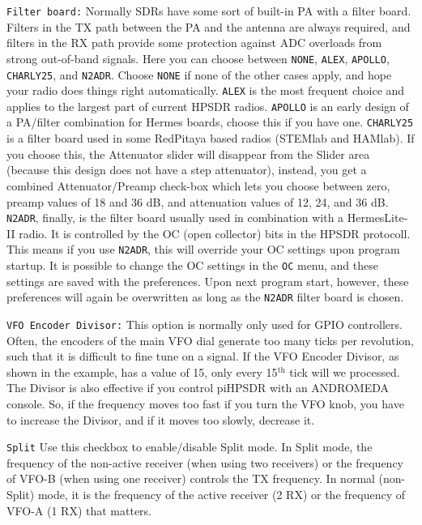\documentclass[12pt]{book}
\def\rett#1{\texttt{\color{red}#1}}
\def\bltt#1{\texttt{\color{blue}#1}}
\begin{document}
\rett{Filter board:} Normally SDRs have some sort of built-in PA with a filter board. Filters in the TX path
between the PA and the antenna are always required, and filters in the RX path provide some protection
against ADC overloads from strong out-of-band signals. Here you can choose between \texttt{NONE},
\texttt{ALEX},
\texttt{APOLLO}, \texttt{CHARLY25}, and \texttt{N2ADR}. Choose \texttt{NONE} if none of the other cases
apply, and hope your radio does things right automatically. \texttt{ALEX} is the most frequent choice
and applies to the largest part of current HPSDR radios. \texttt{APOLLO} is an early design of a
PA/filter combination for Hermes boards, choose this if you have one. \texttt{CHARLY25} is a filter board
used in some RedPitaya based radios (STEMlab and HAMlab). If you choose this, the Attenuator slider will
disappear from the Slider area (because this design does not have a step attenuator), instead, you get
a combined Attenuator/Preamp check-box which lets you choose between zero, preamp values of 18 and 36 dB,
and attenuation values of 12, 24, and 36 dB. \texttt{N2ADR}, finally, is the filter board usually used
in combination with a HermesLite-II radio. It is controlled by the OC (open collector) bits in the HPSDR
protocoll. This means if you use \texttt{N2ADR}, this will override your OC settings upon program startup.
It is possible to change the OC settings in the \bltt{OC} menu, and these settings are saved with the
preferences. Upon next program start, however, these preferences will again be overwritten as long
as the \texttt{N2ADR} filter board is chosen.

\rett{VFO Encoder Divisor:} This option is normally only used for GPIO controllers. Often, the
encoders of the main VFO dial generate too many ticks per revolution, such that it is difficult
to fine tune on a signal. If the VFO Encoder Divisor, as shown in the example, has a value of
15, only every 15$^\textrm{th}$ tick will we processed. The Divisor is also effective if you
control piHPSDR with an ANDROMEDA console. So, if the frequency moves too fast if you turn
the VFO knob, you have to increase the Divisor, and if it moves too slowly, decrease it.

\rett{Split} Use this checkbox to enable/disable Split mode. In Split mode, the frequency of
the non-active receiver (when using two receivers) or the frequency of VFO-B (when using one
receiver) controls the TX frequency. In normal (non-Split) mode, it is the frequency of
the active receiver (2 RX) or the frequency of VFO-A (1 RX) that matters.
\end{document}
